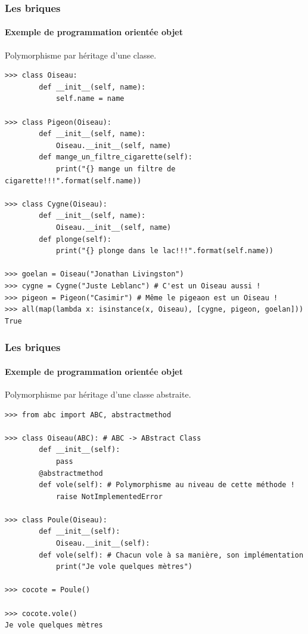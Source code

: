 \documentclass{beamer}
\begin{document}
    \begin{frame}[fragile]
        \transdissolve
        \frametitle{Les briques}
        \framesubtitle{Exemple de programmation orientée objet}
        Polymorphisme par héritage d'une classe.
        \begin{lstlisting}
>>> class Oiseau:
        def __init__(self, name):
            self.name = name

>>> class Pigeon(Oiseau):
        def __init__(self, name):
            Oiseau.__init__(self, name)
        def mange_un_filtre_cigarette(self):
            print("{} mange un filtre de cigarette!!!".format(self.name))

>>> class Cygne(Oiseau):
        def __init__(self, name):
            Oiseau.__init__(self, name)
        def plonge(self):
            print("{} plonge dans le lac!!!".format(self.name))

>>> goelan = Oiseau("Jonathan Livingston")
>>> cygne = Cygne("Juste Leblanc") # C'est un Oiseau aussi !
>>> pigeon = Pigeon("Casimir") # Même le pigeaon est un Oiseau !
>>> all(map(lambda x: isinstance(x, Oiseau), [cygne, pigeon, goelan]))
True
        \end{lstlisting}
    \end{frame}

    \begin{frame}[fragile]
        \transdissolve
        \frametitle{Les briques}
        \framesubtitle{Exemple de programmation orientée objet}
        Polymorphisme par héritage d'une classe abstraite.
        \begin{lstlisting}
>>> from abc import ABC, abstractmethod

>>> class Oiseau(ABC): # ABC -> ABstract Class
        def __init__(self):
            pass
        @abstractmethod
        def vole(self): # Polymorphisme au niveau de cette méthode !
            raise NotImplementedError

>>> class Poule(Oiseau):
        def __init__(self):
            Oiseau.__init__(self):
        def vole(self): # Chacun vole à sa manière, son implémentation
            print("Je vole quelques mètres")

>>> cocote = Poule()

>>> cocote.vole()
Je vole quelques mètres
        \end{lstlisting}
    \end{frame}
\end{document}
